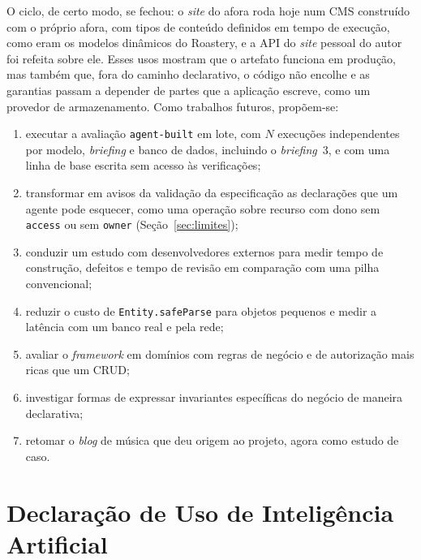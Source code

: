 \documentclass[a4paper,12pt]{article}
\newcommand{\estr}[1]{\textit{#1}}
\begin{document}
O ciclo, de certo modo, se fechou: o \estr{site} do afora roda hoje num CMS construído com o próprio afora, com tipos de conteúdo definidos em tempo de execução, como eram os modelos dinâmicos do Roastery, e a API do \estr{site} pessoal do autor foi refeita sobre ele. Esses usos mostram que o artefato funciona em produção, mas também que, fora do caminho declarativo, o código não encolhe e as garantias passam a depender de partes que a aplicação escreve, como um provedor de armazenamento. Como trabalhos futuros, propõem-se:
\begin{enumerate}
  \item executar a avaliação \texttt{agent-built} em lote, com $N$ execuções independentes por modelo, \estr{briefing} e banco de dados, incluindo o \estr{briefing}~3, e com uma linha de base escrita sem acesso às verificações;
  \item transformar em avisos da validação da especificação as declarações que um agente pode esquecer, como uma operação sobre recurso com dono sem \texttt{access} ou sem \texttt{owner} (Seção~\ref{sec:limites});
  \item conduzir um estudo com desenvolvedores externos para medir tempo de construção, defeitos e tempo de revisão em comparação com uma pilha convencional;
  \item reduzir o custo de \texttt{Entity.safeParse} para objetos pequenos e medir a latência com um banco real e pela rede;
  \item avaliar o \estr{framework} em domínios com regras de negócio e de autorização mais ricas que um CRUD;
  \item investigar formas de expressar invariantes específicas do negócio de maneira declarativa;
  \item retomar o \estr{blog} de música que deu origem ao projeto, agora como estudo de caso.
\end{enumerate}

\section*{Declaração de Uso de Inteligência Artificial}
\end{document}

